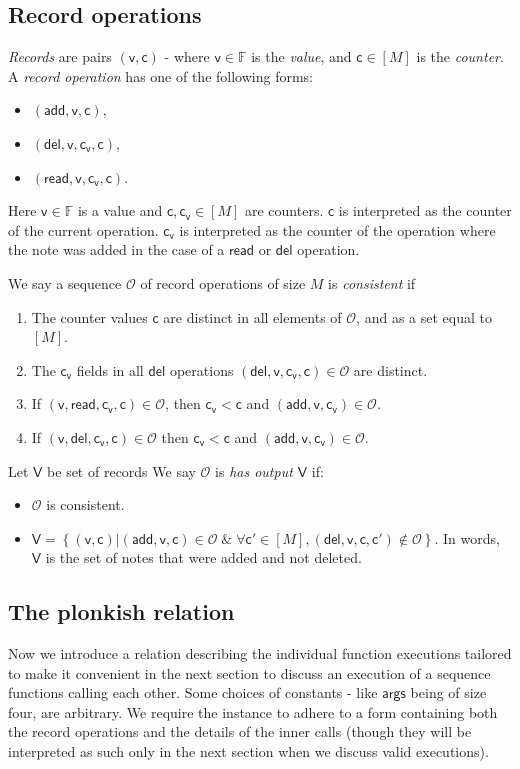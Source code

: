 \documentclass[11pt]{article} %
\newcommand{\F}{\ensuremath{\mathbb F}\xspace}
\newcommand{\set}[1]{\ensuremath{\left\{#1\right\}}\xspace}
\renewcommand{\c}{\ensuremath{\mathsf{c}}\xspace}
\newcommand{\vc}{\ensuremath{\mathsf{c_v}}\xspace}
\renewcommand{\v}{\ensuremath{\mathsf{v}}\xspace}
\newcommand{\add}{\ensuremath{\mathsf{add}}\xspace}
\newcommand{\del}{\ensuremath{\mathsf{del}}\xspace}
\renewcommand{\read}{\ensuremath{\mathsf{read}}\xspace}
\newcommand{\countrange}{\ensuremath{[M]}\xspace}
\newcommand{\ops}{\ensuremath{\mathcal{O}}\xspace}
\newcommand{\args}{\ensuremath{\mathsf{args}}\xspace}
\newcommand{\recset}{\ensuremath{\mathsf{V}}\xspace}
\begin{document}
\subsection{Record operations}
\emph{Records} are pairs $(\v,\c)$ - where $\v\in \F$ is the \emph{value}, and $\c\in \countrange$ is the \emph{counter}.
A \emph{record operation} has one of the following forms:
\begin{itemize}
 \item $(\add,\v,\c)$,
\item $(\del,\v,\vc,\c)$,
\item $(\read,\v,\vc,\c)$.

\end{itemize}
Here $\v\in \F$ is a value and $\c,\vc \in \countrange$ are counters.
$\c$ is interpreted as the counter of the current operation. $\vc$
  is interpreted as the counter of the operation where
the note was added in the case of a \read or \del operation.



We say a sequence \ops of record operations of size $M$ is \emph{consistent} if 
\begin{enumerate}
\item The counter values $\c$ are distinct in all elements of \ops, and as a set equal to \countrange.
\item The $\vc$ fields in all $\del$ operations $(\del,\v,\vc,\c)\in \ops$ are distinct.
\item If $(\v,\read,\vc,\c)\in \ops$, then $\vc<\c$ and $(\add, \v,\vc)\in \ops$.
\item If $(\v,\del,\vc,\c)\in \ops$ then $\vc<\c$ and $(\add,\v,\vc)\in \ops$.
\end{enumerate}

Let \recset be set of records 
We say $\ops$ is \emph{has output \recset} if:
\begin{itemize}
 \item $\ops$ is consistent.
 \item $\recset=\set{(\v,\c) | (\add,\v,\c)\in \ops\;\&\; \forall \c'\in \countrange,(\del,\v,\c,\c')\notin \ops }$. In words,
 \recset is the set of notes that were added and not deleted.
\end{itemize}



\subsection{The plonkish relation}
Now we introduce a relation describing the individual function executions tailored to make it convenient in the next section to discuss an execution of a  sequence functions calling each other.
Some choices of constants - like \args being of size four, are arbitrary.
We require the instance to adhere to a form containing both the record operations and the details of the inner calls (though they will be interpreted as such only in the next section when we discuss valid executions).
\end{document}
